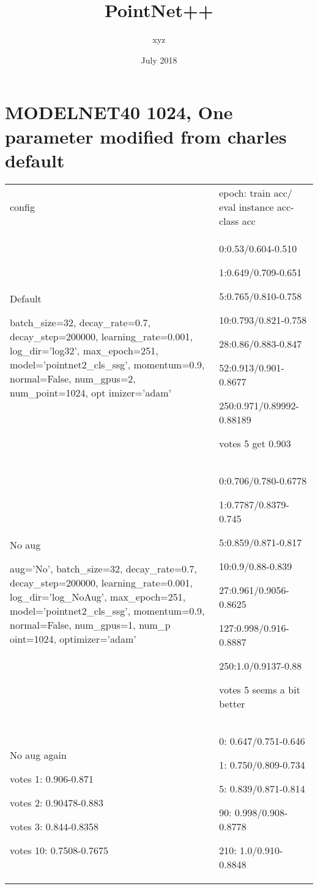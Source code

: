 \documentclass[,table,dvipsnames]{article}
\title{PointNet++}
\author{xyz}
\date{July 2018}
\begin{document}
\noindent
\begin{titlepage}
	\maketitle
\end{titlepage}	


\section{MODELNET40 1024, One parameter modified from charles default}
\noindent\begin{tabular}{|p{10cm}|p{5.5cm}| }	
	\hline
	
	config & epoch: train acc/ eval instance acc-class acc\\
	
	\rowcolor{green!20}
	Default\par 
	batch\_size=32, decay\_rate=0.7, decay\_step=200000, learning\_rate=0.001, log\_dir='log32', max\_epoch=251, model='pointnet2\_cls\_ssg', momentum=0.9, normal=False, num\_gpus=2, num\_point=1024, opt     imizer='adam'&
	0:0.53/0.604-0.510\par 1:0.649/0.709-0.651\par 5:0.765/0.810-0.758\par 10:0.793/0.821-0.758\par 28:0.86/0.883-0.847\par 52:0.913/0.901-0.8677\par 250:0.971/0.89992-0.88189\par votes 5 get 0.903\\
	
	\rowcolor{yellow!20}
	No aug\par
	aug='No', batch\_size=32, decay\_rate=0.7, decay\_step=200000, learning\_rate=0.001, log\_dir='log\_NoAug', max\_epoch=251, model='pointnet2\_cls\_ssg', momentum=0.9, normal=False, num\_gpus=1, num\_p     oint=1024, optimizer='adam' & 0:0.706/0.780-0.6778\par 1:0.7787/0.8379-0.745\par 5:0.859/0.871-0.817\par 10:0.9/0.88-0.839 \par 27:0.961/0.9056-0.8625\par 127:0.998/0.916-0.8887\par 250:1.0/0.9137-0.88\par votes 5 seems a bit better\\	

	\rowcolor{orange!20}
	No aug again\par
	votes 1: 0.906-0.871\par votes 2: 0.90478-0.883\par votes 3: 0.844-0.8358\par votes 10: 0.7508-0.7675
	&0: 0.647/0.751-0.646\par 1: 0.750/0.809-0.734\par 5: 0.839/0.871-0.814\par 90: 0.998/0.908-0.8778\par 210: 1.0/0.910-0.8848
	\\


\end{tabular}
\end{document}
